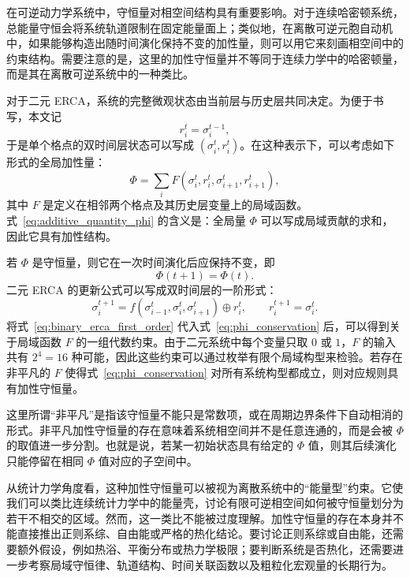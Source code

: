 \documentclass[reprint, amsmath, amssymb, aps, physrev,prb]{revtex4-2}
\begin{document}
在可逆动力学系统中，守恒量对相空间结构具有重要影响。对于连续哈密顿系统，总能量守恒会将系统轨道限制在固定能量面上；类似地，在离散可逆元胞自动机中，如果能够构造出随时间演化保持不变的加性量，则可以用它来刻画相空间中的约束结构\cite{YPomeau_1984}。需要注意的是，这里的加性守恒量并不等同于连续力学中的哈密顿量，而是其在离散可逆系统中的一种类比。

对于二元 ERCA，系统的完整微观状态由当前层与历史层共同决定。为便于书写，本文记
\begin{equation}
    r_i^t = \sigma_i^{t-1},
\end{equation}
于是单个格点的双时间层状态可以写成 $(\sigma_i^t,r_i^t)$。在这种表示下，可以考虑如下形式的全局加性量：
\begin{equation}
    \Phi
    =
    \sum_i
    F(\sigma_i^t,r_i^t,\sigma_{i+1}^t,r_{i+1}^t),
    \label{eq:additive_quantity_phi}
\end{equation}
其中 $F$ 是定义在相邻两个格点及其历史层变量上的局域函数。式~\eqref{eq:additive_quantity_phi} 的含义是：全局量 $\Phi$ 可以写成局域贡献的求和，因此它具有加性结构。

若 $\Phi$ 是守恒量，则它在一次时间演化后应保持不变，即
\begin{equation}
    \Phi(t+1)=\Phi(t).
    \label{eq:phi_conservation}
\end{equation}
二元 ERCA 的更新公式可以写成双时间层的一阶形式：
\begin{equation}
    \sigma_i^{t+1}
    =
    f(\sigma_{i-1}^{t},\sigma_i^{t},\sigma_{i+1}^{t})
    \oplus r_i^t,
    \qquad
    r_i^{t+1}=\sigma_i^t .
    \label{eq:binary_erca_first_order}
\end{equation}
将式~\eqref{eq:binary_erca_first_order} 代入式~\eqref{eq:phi_conservation} 后，可以得到关于局域函数 $F$ 的一组代数约束。由于二元系统中每个变量只取 $0$ 或 $1$，$F$ 的输入共有 $2^4=16$ 种可能，因此这些约束可以通过枚举有限个局域构型来检验。若存在非平凡的 $F$ 使得式~\eqref{eq:phi_conservation} 对所有系统构型都成立，则对应规则具有加性守恒量。

这里所谓“非平凡”是指该守恒量不能只是常数项，或在周期边界条件下自动相消的形式。非平凡加性守恒量的存在意味着系统相空间并不是任意连通的，而是会被 $\Phi$ 的取值进一步分割。也就是说，若某一初始状态具有给定的 $\Phi$ 值，则其后续演化只能停留在相同 $\Phi$ 值对应的子空间中。

从统计力学角度看\cite{YPomeau_1984}，这种加性守恒量可以被视为离散系统中的“能量型”约束。它使我们可以类比连续统计力学中的能量壳，讨论有限可逆相空间如何被守恒量划分为若干不相交的区域。然而，这一类比不能被过度理解。加性守恒量的存在本身并不能直接推出正则系综、自由能或严格的热化结论。要讨论正则系综或自由能，还需要额外假设，例如热浴、平衡分布或热力学极限；要判断系统是否热化，还需要进一步考察局域守恒律、轨道结构、时间关联函数以及粗粒化宏观量的长期行为。
\end{document}
